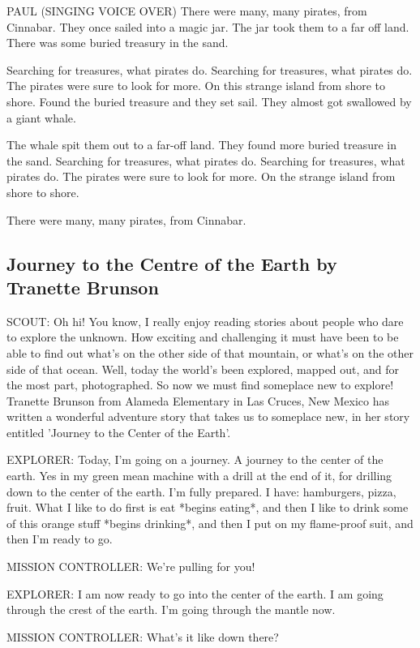 PAUL (SINGING VOICE OVER)
There were many, many pirates, from Cinnabar.
They once sailed into a magic jar.
The jar took them to a far off land.
There was some buried treasury in the sand.

Searching for treasures, what pirates do.
Searching for treasures, what pirates do.
The pirates were sure to look for more.
On this strange island from shore to shore.
Found the buried treasure and they set sail.
They almost got swallowed by a giant whale.

The whale spit them out to a far-off land.
They found more buried treasure in the sand.
Searching for treasures, what pirates do.
Searching for treasures, what pirates do.
The pirates were sure to look for more.
On the strange island from shore to shore.

There were many, many pirates, from Cinnabar.

\subsection{Journey to the Centre of the Earth by Tranette Brunson}

SCOUT:
Oh hi!
You know, I really enjoy reading stories about people who dare to explore the unknown.
How exciting and challenging it must have been to be able to find out what's on the other side of that mountain, or what's on the other side of that ocean.
Well, today the world's been explored, mapped out, and for the most part, photographed.
So now we must find someplace new to explore!
Tranette Brunson from Alameda Elementary in Las Cruces, New Mexico has written a wonderful adventure story that takes us to someplace new, in her story entitled 'Journey to the Center of the Earth'.

EXPLORER:
Today, I'm going on a journey.
A journey to the center of the earth.
Yes in my green mean machine with a drill at the end of it, for drilling down to the center of the earth.
I'm fully prepared.
I have: hamburgers, pizza, fruit.
What I like to do first is eat *begins eating*, and then I like to drink some of this orange stuff *begins drinking*, and then I put on my flame-proof suit, and then I'm ready to go.

MISSION CONTROLLER:
We're pulling for you!

EXPLORER:
I am now ready to go into the center of the earth.
I am going through the crest of the earth.
I'm going through the mantle now.

MISSION CONTROLLER:
What's it like down there?

